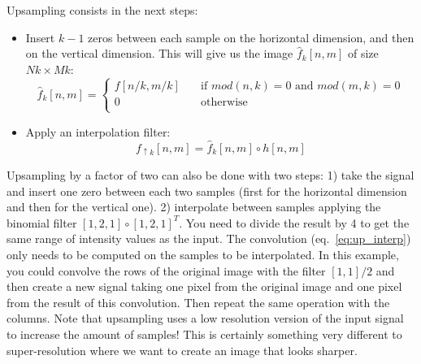 Upsampling consists in the next steps:
\begin{itemize}
  \item Insert $k-1$ zeros between each sample on the horizontal dimension, and then on the vertical dimension. This will give us the image $\widehat{f}_k \left[n,m\right]$ of size $Nk \times Mk$:
        \begin{equation}
          \widehat{f}_k \left[n,m\right] =
          \begin{cases}
            f \left[n/k,m/k\right] & \quad \text{if } mod(n,k)=0 \text{~and~} mod(m,k)=0 \\
            0                      & \quad \text{otherwise }                             \\
          \end{cases}
          \label{eq:upzeros}
        \end{equation}
  \item Apply an interpolation filter:
        \begin{equation}
          f_{\uparrow k} \left[n,m\right] = \widehat{f}_k \left[n,m\right] \circ h \left[n,m\right]
          \label{eq:up_interp}
        \end{equation}
\end{itemize}
Upsampling by a factor of two can also be done with two steps: 1) take the signal and insert one zero between each two samples (first for the horizontal dimension and then for the vertical one). 2) interpolate between samples applying the binomial filter $\left[1,2,1\right] \circ \left[1,2,1\right]^T$. You need to divide the result by 4 to get the same range of intensity values as the input. The convolution (eq.~\ref{eq:up_interp}) only needs to be computed on the samples to be interpolated. In this example, you could convolve the rows of the original image with the filter $\left[1,1\right]/2$ and then create a new signal taking one pixel from the original image and one pixel from the result of this convolution. Then repeat the same operation with the columns. Note that upsampling uses a low resolution version of the input signal to increase the amount of samples! This is certainly something very different to super-resolution where we want to create an image that looks sharper.


